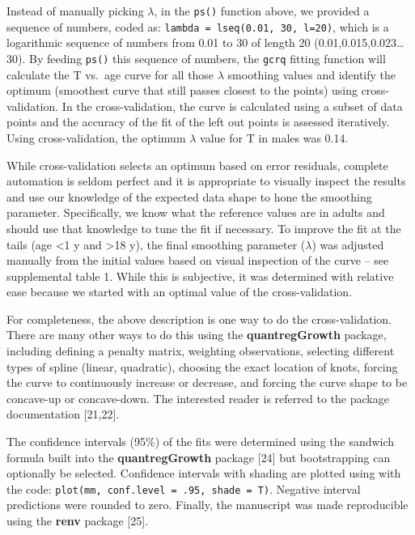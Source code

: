 \documentclass[]{elsarticle} %
\begin{document}
Instead of manually picking \(\lambda\), in the \texttt{ps()} function
above, we provided a sequence of numbers, coded as:
\texttt{lambda\ =\ lseq(0.01,\ 30,\ l=20)}, which is a logarithmic
sequence of numbers from 0.01 to 30 of length 20
(0.01,0.015,0.023\ldots30). By feeding \texttt{ps()} this sequence of
numbers, the \texttt{gcrq} fitting function will calculate the T vs.~age
curve for all those \(\lambda\) smoothing values and identify the
optimum (smoothest curve that still passes closest to the points) using
cross-validation. In the cross-validation, the curve is calculated using
a subset of data points and the accuracy of the fit of the left out
points is assessed iteratively. Using cross-validation, the optimum
\(\lambda\) value for T in males was 0.14.

While cross-validation selects an optimum based on error residuals,
complete automation is seldom perfect and it is appropriate to visually
inspect the results and use our knowledge of the expected data shape to
hone the smoothing parameter. Specifically, we know what the reference
values are in adults and should use that knowledge to tune the fit if
necessary. To improve the fit at the tails (age \textless1 y and
\textgreater18 y), the final smoothing parameter (\(\lambda\)) was
adjusted manually from the initial values based on visual inspection of
the curve -- see supplemental table 1. While this is subjective, it was
determined with relative ease because we started with an optimal value
of the cross-validation.

For completeness, the above description is one way to do the
cross-validation. There are many other ways to do this using the
\textbf{quantregGrowth} package, including defining a penalty matrix,
weighting observations, selecting different types of spline (linear,
quadratic), choosing the exact location of knots, forcing the curve to
continuously increase or decrease, and forcing the curve shape to be
concave-up or concave-down. The interested reader is referred to the
package documentation {[}21,22{]}.

The confidence intervals (95\%) of the fits were determined using the
sandwich formula built into the \textbf{quantregGrowth} package {[}24{]}
but bootstrapping can optionally be selected. Confidence intervals with
shading are plotted using with the code:
\texttt{plot(mm,\ conf.level\ =\ .95,\ shade\ =\ T)}. Negative interval
predictions were rounded to zero. Finally, the manuscript was made
reproducible using the \textbf{renv} package {[}25{]}.
\end{document}
